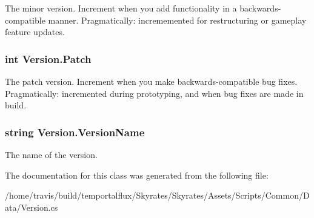 The minor version. Increment when you add functionality in a backwards-\/compatible manner. Pragmatically\-: incrememented for restructuring or gameplay feature updates. 

\hypertarget{class_version_a4ec3e76901e7c0d080b3113d24e3a5aa}{
\subsubsection[{Patch}]{\setlength{\rightskip}{0pt plus 5cm}int Version.\-Patch}}\label{class_version_a4ec3e76901e7c0d080b3113d24e3a5aa}


The patch version. Increment when you make backwards-\/compatible bug fixes. Pragmatically\-: incremented during prototyping, and when bug fixes are made in build. 

\hypertarget{class_version_a55ae9ac9a38915b9bc0cfab9953e9c21}{
\subsubsection[{Version\-Name}]{\setlength{\rightskip}{0pt plus 5cm}string Version.\-Version\-Name}}\label{class_version_a55ae9ac9a38915b9bc0cfab9953e9c21}


The name of the version. 



The documentation for this class was generated from the following file\-:\begin{DoxyCompactItemize}
\item 
/home/travis/build/temportalflux/\-Skyrates/\-Skyrates/\-Assets/\-Scripts/\-Common/\-Data/Version.\-cs\end{DoxyCompactItemize}
